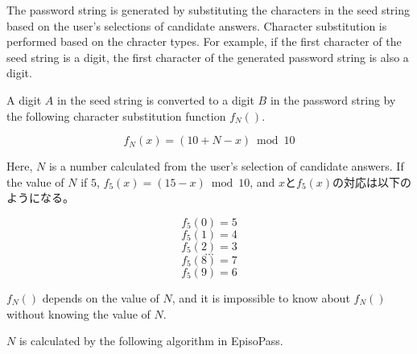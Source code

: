 \documentclass{article}
\begin{document}


The password string is generated by
substituting the characters in the seed string
based on the user's selections of candidate answers.
Character substitution is performed based on the chracter types.
For example, if the first character of the seed string is a digit,
the first character of the generated password string is also a digit.


A digit $A$ in the seed string is converted to a digit $B$
in the password string by the following
character substitution function $f_N()$.

\[ f_N(x) = (10 + N - x) \bmod 10 \]


Here, $N$ is a number calculated from the user's selection of
candidate answers.
If the value of $N$ if $5$, $f_5(x) = (15-x) \bmod 10$, and
$x$と$f_5(x)$の対応は以下のようになる。

\[ f_5(0) = 5 \]
\[ f_5(1) = 4 \]
\[ f_5(2) = 3 \]
\[ ... \]
\[ f_5(8) = 7 \]
\[ f_5(9) = 6 \]


$f_N()$ depends on the value of $N$, and
it is impossible to know about $f_N()$ without knowing the value of $N$.
 

$N$ is calculated by the following algorithm in EpisoPass.
 
\end{document}
